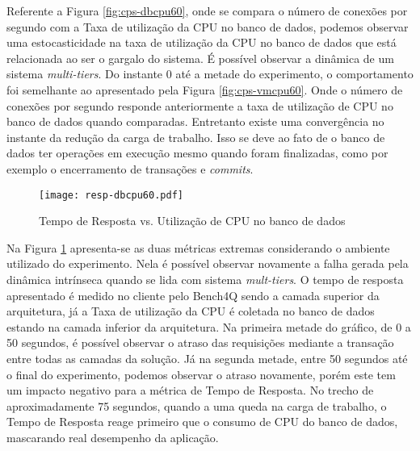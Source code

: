 Referente a Figura \ref{fig:cps-dbcpu60}, onde se compara o número de conexões por segundo com a Taxa de utilização da CPU no banco de dados, podemos observar uma estocasticidade na taxa de utilização da CPU no banco de dados que está relacionada ao ser o gargalo do sistema. É possível observar a dinâmica de um sistema \textit{multi-tiers}. Do instante 0 até a metade do experimento, o comportamento foi semelhante ao apresentado pela Figura \ref{fig:cps-vmcpu60}. Onde o número de conexões por segundo responde anteriormente a taxa de utilização de CPU no banco de dados quando comparadas. Entretanto existe uma convergência no instante da redução da carga de trabalho. Isso se deve ao fato de o banco de dados ter operações em execução mesmo quando foram finalizadas, como por exemplo o encerramento de transações e \textit{commits}. 

\begin{figure}[htb]
	\centering
	\texttt{[image: resp-dbcpu60.pdf]}
	\caption{Tempo de Resposta vs. Utilização de CPU no banco de dados}
	\label{fig:resp-dbcpu60}
	\fdadospesquisa
\end{figure}

Na Figura \ref{fig:resp-dbcpu60} apresenta-se as duas métricas extremas considerando o ambiente utilizado do experimento. Nela é possível observar novamente a falha gerada pela dinâmica intrínseca quando se lida com sistema \textit{mult-tiers}. O tempo de resposta apresentado é medido no cliente pelo Bench4Q sendo a camada superior da arquitetura, já a Taxa de utilização da CPU é coletada no banco de dados estando na camada inferior da arquitetura. Na primeira metade do gráfico, de 0 a 50 segundos, é possível observar o atraso das requisições mediante a transação entre todas as camadas da solução. Já na segunda metade, entre 50 segundos até o final do experimento, podemos observar o atraso novamente, porém este tem um impacto negativo para a métrica de Tempo de Resposta. No trecho de aproximadamente 75 segundos, quando a uma queda na carga de trabalho, o Tempo de Resposta reage primeiro que o consumo de CPU do banco de dados, mascarando real desempenho da aplicação.
